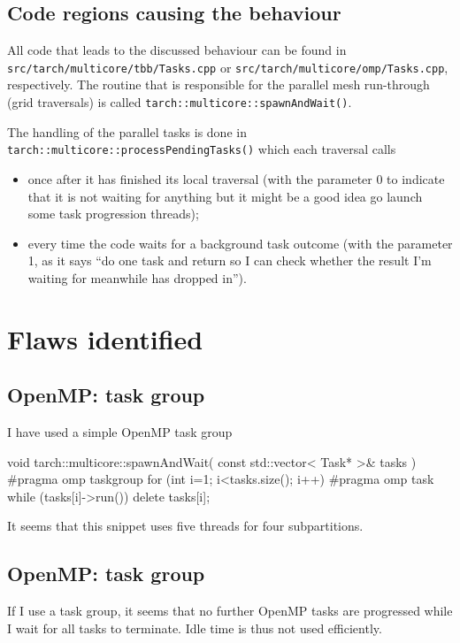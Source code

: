 \subsection{Code regions causing the behaviour}

All code that leads to the discussed behaviour can be found in
\texttt{src/tarch/multicore/tbb/Tasks.cpp} or
\texttt{src/tarch/multicore/omp/Tasks.cpp}, respectively.
The routine that is responsible for the parallel mesh run-through (grid
traversals) is called \texttt{tarch::multicore::spawnAndWait()}.


The handling of the parallel tasks is done in
\texttt{tarch::multicore::processPendingTasks()} which each traversal calls
\begin{itemize}
  \item once after it has finished its local traversal (with the parameter 0 to
  indicate that it is not waiting for anything but it might be a good idea go
  launch some task progression threads);
  \item every time the code waits for a background task outcome (with the
  parameter 1, as it says ``do one task and return so I can check whether the
  result I'm waiting for meanwhile has dropped in'').
\end{itemize}


\section{Flaws identified}


\subsection{OpenMP: task group}

I have used a simple OpenMP task group
\begin{code}
void tarch::multicore::spawnAndWait(
  const std::vector< Task* >&  tasks
) {
  #pragma omp taskgroup
  for (int i=1; i<tasks.size(); i++) {
    #pragma omp task
    {
      while (tasks[i]->run()) {}
      delete tasks[i];
    }
  }
}
\end{code}

\noindent
It seems that this snippet uses five threads for four subpartitions. 



\subsection{OpenMP: task group}

If I use a task group, it seems that no further OpenMP tasks are progressed
while I wait for all tasks to terminate.
Idle time is thus not used efficiently.
